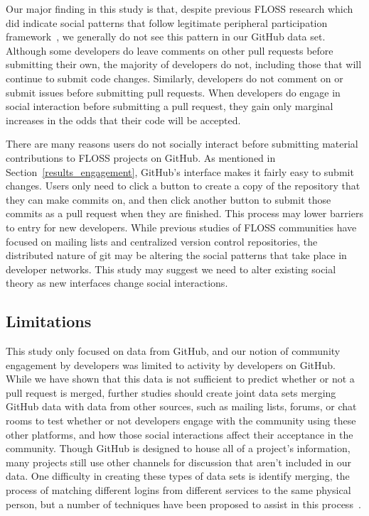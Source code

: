 \documentclass{sigchi}
\begin{document}
Our major finding in this study is that, despite previous FLOSS research which
did indicate social patterns that follow legitimate peripheral participation
framework~\cite{ducheneaut_socialization_2005, huang_mining_2005,
ye_toward_2003}, we generally do not see this pattern in our GitHub data set.
Although some developers do leave comments on other pull requests before
submitting their own, the majority of developers do not, including those that
will continue to submit code changes. Similarly, developers do not comment on 
or submit issues before submitting pull requests. When developers do engage in
social interaction before submitting a pull request, they gain only marginal
increases in the odds that their code will be accepted.

There are many reasons users do not socially interact before submitting 
material contributions to FLOSS projects on GitHub. As mentioned in 
Section~\ref{results_engagement}, GitHub's interface makes it
fairly easy to submit changes. Users only need to click a button to create a
copy of the repository that they can make commits on, and then click another
button to submit those commits as a pull request when they are finished. This
process may lower barriers to entry for new developers. While previous studies
of FLOSS communities have focused on mailing lists and centralized version
control repositories, the distributed nature of git may be altering the social
patterns that take place in developer networks. This study may suggest we need
to alter existing social theory as new interfaces change social interactions.

\subsection{Limitations} \label{sec:limitations}

This study only focused on data from GitHub, and our notion of community
engagement by developers was limited to activity by developers on GitHub. While
we have shown that this data is not sufficient to predict whether or not a pull
request is merged, further studies should create joint data sets merging GitHub
data with data from other sources, such as mailing lists, forums, or chat rooms
to test whether or not developers engage with the community using these other
platforms, and how those social interactions affect their acceptance in the
community. Though GitHub is designed to house all of a project's information,
many projects still use other channels for discussion that aren't included in
our data. One difficulty in creating these types of data sets is identify
merging, the process of matching different logins from different services to the
same physical person, but a number of techniques have been proposed to assist in
this process~\cite{bird_open_2007, goeminne_comparison_2013, kouters_whos_2012}.
\end{document}
